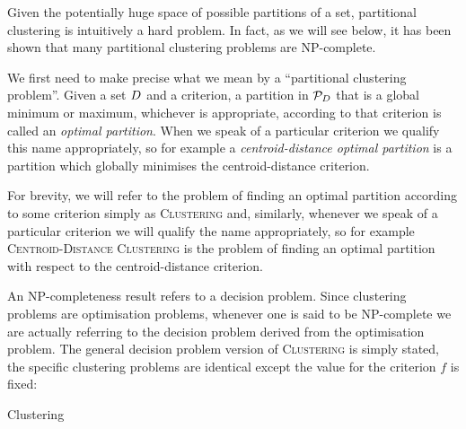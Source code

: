 Given the potentially huge space of possible partitions of a set, partitional
clustering is intuitively a hard problem.  In fact, as we will see below, it
has been shown that many partitional clustering problems are NP-complete.

We first need to make precise what we mean by a ``partitional clustering
problem''.  Given a set $D$ and a criterion, a partition in
$\mathcal{P}_{D}$ that is a global minimum or maximum, whichever is
appropriate, according to that criterion is called an \textit{optimal
  partition}.  When we speak of a particular criterion we qualify this name
appropriately, so for example a \textit{centroid-distance optimal partition}
is a partition which globally minimises the centroid-distance criterion.

For brevity, we will refer to the problem of finding an optimal partition
according to some criterion simply as \textsc{Clustering} and, similarly,
whenever we speak of a particular criterion we will qualify the name
appropriately, so for example \textsc{Centroid-Distance Clustering} is the
problem of finding an optimal partition with respect to the centroid-distance
criterion.

An NP-completeness result refers to a decision problem.  Since clustering
problems are optimisation problems, whenever one is said to be NP-complete we
are actually referring to the decision problem derived from the optimisation
problem.  The general decision problem version of \textsc{Clustering} is
simply stated, the specific clustering problems are identical except the value
for the criterion $f$ is fixed:
\begin{problem}{Clustering}
\end{problem}

